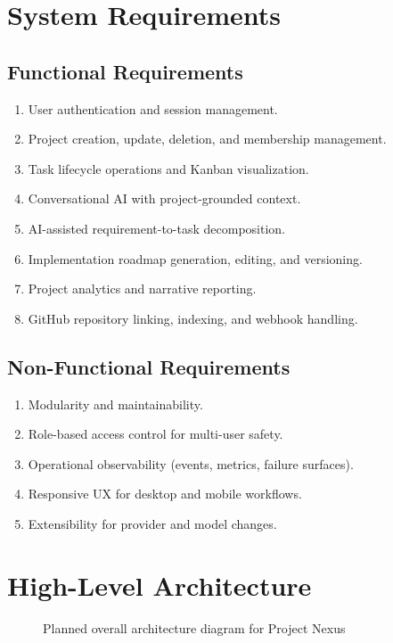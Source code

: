 \documentclass[a4paper, 11pt, oneside]{Dissertation}
\begin{document}
\section{System Requirements}

\subsection{Functional Requirements}
\begin{enumerate}
\item User authentication and session management.
\item Project creation, update, deletion, and membership management.
\item Task lifecycle operations and Kanban visualization.
\item Conversational AI with project-grounded context.
\item AI-assisted requirement-to-task decomposition.
\item Implementation roadmap generation, editing, and versioning.
\item Project analytics and narrative reporting.
\item GitHub repository linking, indexing, and webhook handling.
\end{enumerate}

\subsection{Non-Functional Requirements}
\begin{enumerate}
\item Modularity and maintainability.
\item Role-based access control for multi-user safety.
\item Operational observability (events, metrics, failure surfaces).
\item Responsive UX for desktop and mobile workflows.
\item Extensibility for provider and model changes.
\end{enumerate}

\section{High-Level Architecture}
\begin{figure}[H]
\centering
{}
\caption{Planned overall architecture diagram for Project Nexus}
\label{fig:overall-architecture}
\end{figure}
\end{document}
